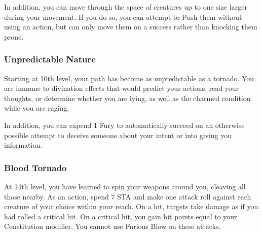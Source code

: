 In addition, you can move through the space of creatures up to one size larger during your movement. If you do so, you can attempt to Push them without using an action, but can only move them on a success rather than knocking them prone.

\subsubsection{Unpredictable Nature}
Starting at 10th level, your path has become as unpredictable as a tornado. You are immune to divination effects that would predict your actions, read your thoughts, or determine whether you are lying, as well as the charmed condition while you are raging.

In addition, you can expend 1 Fury to automatically succeed on an otherwise possible attempt to deceive someone about your intent or into giving you information.

\subsubsection{Blood Tornado}
At 14th level, you have learned to spin your weapons around you, cleaving all those nearby. As an action, spend 7 STA and make one attack roll against each creature of your choice within your reach. On a hit, targets take damage as if you had rolled a critical hit. On a critical hit, you gain hit points equal to your Constitution modifier. You cannot use Furious Blow on these attacks.